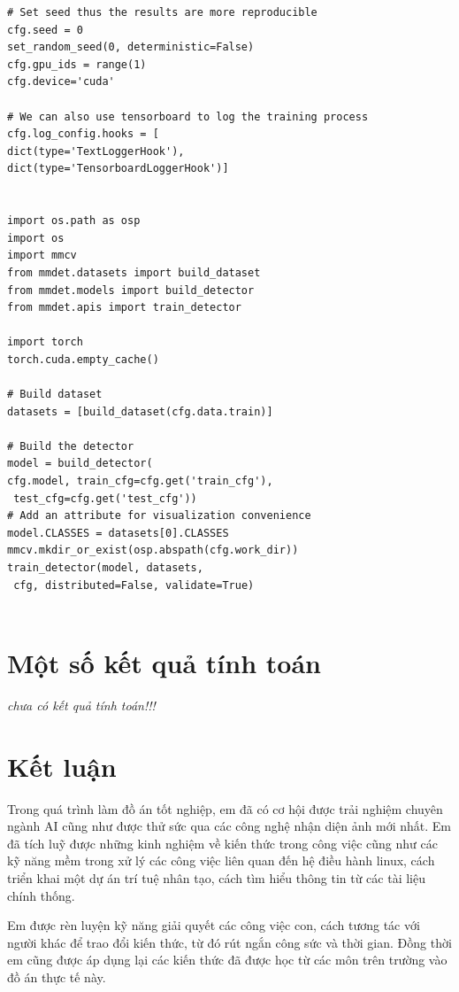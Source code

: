 \documentclass[12pt,a4paper,openany,oneside]{report}
\begin{document}
\begin{lstlisting}
# Set seed thus the results are more reproducible
cfg.seed = 0
set_random_seed(0, deterministic=False)
cfg.gpu_ids = range(1)
cfg.device='cuda'

# We can also use tensorboard to log the training process
cfg.log_config.hooks = [
dict(type='TextLoggerHook'),
dict(type='TensorboardLoggerHook')]


import os.path as osp
import os
import mmcv
from mmdet.datasets import build_dataset
from mmdet.models import build_detector
from mmdet.apis import train_detector

import torch
torch.cuda.empty_cache()

# Build dataset
datasets = [build_dataset(cfg.data.train)]

# Build the detector
model = build_detector(
cfg.model, train_cfg=cfg.get('train_cfg'),
 test_cfg=cfg.get('test_cfg'))
# Add an attribute for visualization convenience
model.CLASSES = datasets[0].CLASSES
mmcv.mkdir_or_exist(osp.abspath(cfg.work_dir))
train_detector(model, datasets,
 cfg, distributed=False, validate=True)


\end{lstlisting}

\chapter{Một số kết quả tính toán }
\textit{chưa có kết quả tính toán!!!}








\chapter*{{Kết luận}}

Trong quá trình làm đồ án tốt nghiệp, em đã có cơ hội được trải nghiệm chuyên ngành AI cũng như được thử sức qua các công nghệ nhận diện ảnh mới nhất. Em đã tích luỹ được những kinh nghiệm về kiến thức trong công việc cũng như các kỹ năng mềm trong xử lý các công việc liên quan đến hệ điều hành linux, cách triển khai một dự án trí tuệ nhân tạo, cách tìm hiểu thông tin từ các tài liệu chính thống.
 
Em được rèn luyện kỹ năng giải quyết các công việc con, cách tương tác với người khác để trao đổi kiến thức, từ đó rút ngắn công sức và thời gian. Đồng thời em cũng được áp dụng lại các kiến thức đã được học từ các môn trên trường vào đồ án thực tế này.
\end{document}
